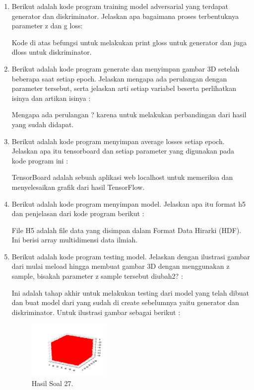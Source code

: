 \begin{enumerate}
    \item Berikut adalah kode program training model adversarial yang terdapat generator dan diskriminator. Jelaskan apa bagaimana proses terbentuknya parameter z dan g loss:
    
    \hfill\break
    Kode di atas befungsi untuk melakukan print gloss untuk generator dan juga dloss untuk diskriminator.

    \item  Berikut adalah kode program generate dan menyimpan gambar 3D setelah beberapa saat setiap epoch. Jelaskan mengapa ada perulangan dengan parameter tersebut, serta jelaskan arti setiap variabel beserta perlihatkan isinya dan artikan isinya :
    
    \hfill\break
    Mengapa ada perulangan ? karena untuk melakukan perbandingan dari hasil yang sudah didapat.

    \item Berikut adalah kode program menyimpan average losses setiap epoch. Jelaskan apa itu tensorboard dan setiap parameter yang digunakan pada kode program ini :
    
    \hfill\break
    TensorBoard adalah sebuah aplikasi web localhost untuk memeriksa dan menyelesaikan grafik dari hasil TensorFlow.
    
    \item Berikut adalah kode program menyimpan model. Jelaskan apa itu format h5 dan penjelasan dari kode program berikut :
    
    \hfill\break
    File H5 adalah file data yang disimpan dalam Format Data Hirarki (HDF). Ini berisi array multidimensi data ilmiah.

    \item Berikut adalah kode program testing model. Jelaskan dengan ilustrasi gambar dari mulai meload hingga membuat gambar 3D dengan menggunakan z sample, bisakah parameter z sample tersebut diubah2? :
    
    \hfill\break
    Ini adalah tahap akhir untuk melakukan testing dari model yang telah dibuat dan buat model dari yang sudah di create sebelumnya yaitu generator dan diskriminator. Untuk ilustrasi gambar sebagai berikut :
    \begin{figure}[H]
        \centering
            \includegraphics[width=4cm]{figures/1174077/8/p27.PNG}
            \caption{Hasil Soal 27.}
        \end{figure}
\end{enumerate}

